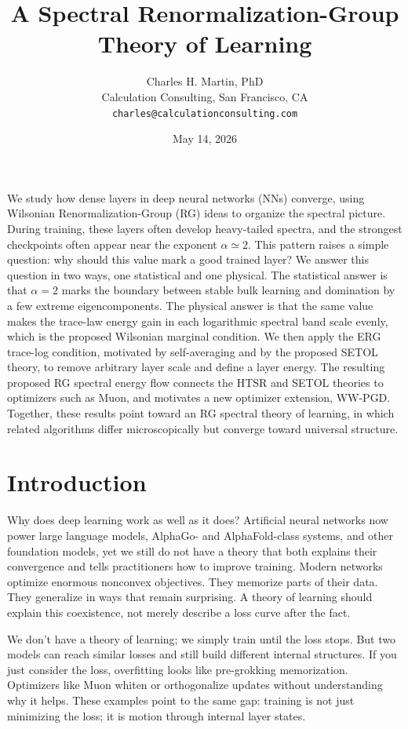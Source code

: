 \documentclass[10pt,twocolumn]{article}
\title{\bfseries A Spectral Renormalization-Group Theory of Learning}
\author{Charles H. Martin, PhD\\
\small Calculation Consulting, San Francisco, CA\\[-0.2em]
\small \texttt{charles@calculationconsulting.com}}
\date{May 14, 2026}
\renewenvironment{abstract}{%
  \par\vspace{-0.85em}\noindent{\bfseries\large Abstract}\par\vspace{0.35em}%
  \small\noindent
}{\par\vspace{0.8em}}
\begin{document}
\maketitle

\begin{abstract}
  We study how dense layers in deep neural networks (NNs) converge, using Wilsonian Renormalization-Group (RG) ideas to organize the spectral picture. During training, these layers often develop heavy-tailed spectra, and the strongest checkpoints often appear near the exponent $\alpha\simeq2$. This pattern raises a simple question: why should this value mark a good trained layer? We answer this question in two ways, one statistical and one physical. The statistical answer is that $\alpha=2$ marks the boundary between stable bulk learning and domination by a few extreme eigencomponents. The physical answer is that the same value makes the trace-law energy gain
  in each logarithmic spectral band scale evenly, which is the proposed Wilsonian marginal condition.
  We then apply the ERG trace-log condition, motivated by self-averaging and by the proposed SETOL theory, to remove arbitrary layer scale and define a layer energy.
The resulting proposed RG spectral energy flow connects the HTSR and SETOL theories to optimizers such as Muon, and motivates a new optimizer extension, WW-PGD. Together, these results point toward an RG spectral theory of learning, in which related algorithms differ microscopically but converge toward universal structure.
\end{abstract}

\section{Introduction}
\label{sxn:intro}

Why does deep learning work as well as it does? Artificial neural networks now power large language models, AlphaGo- and AlphaFold-class systems, and other foundation models, yet we still do not have a theory that both explains their convergence and tells practitioners how to improve training. Modern networks optimize enormous nonconvex objectives. They memorize parts of their data. They generalize in ways that remain surprising. A theory of learning should explain this coexistence, not merely describe a loss curve after the fact.

We don't have a theory of learning; we simply train until the loss stops.
But two models can reach similar losses and still build different internal structures.
If you just consider the loss, overfitting looks like pre-grokking memorization.
Optimizers like Muon whiten or orthogonalize updates without understanding why it helps. These examples point to the same gap: training is not just minimizing the loss; it is motion through internal layer states.
\end{document}
